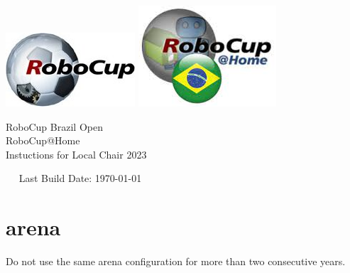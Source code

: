 \documentclass[11pt, twoside, openright, a4paper, chapterprefix]{article}
\begin{document}
\begin{titlepage}
    \begin{center}
      {
        \includegraphics[width=.25\textwidth]{images/logo_RoboCupFed.jpg}
        \hfill
        \includegraphics[width=.23\textwidth]{images/logo_rcbrazilhome.png}\\
        [1.23ex]
      }
      \vspace{2.7 cm}
      \hrulefill\par
      {%
        \vspace*{.27cm}
        \Huge{RoboCup Brazil Open}\\[1.23ex]
        \Huge{RoboCup@Home}\\[1.23ex]
        \Large Instuctions for Local Chair 2023\\[2ex]
      }
      \hrulefill\par
      \vfill
      ~~ Last Build Date: \today \quad 
      \vfill
    \end{center}
  \end{titlepage}


% 
% 
% 

\clearpage




\section{arena}

Do not use the same arena configuration for more than two consecutive years.
\end{document}
